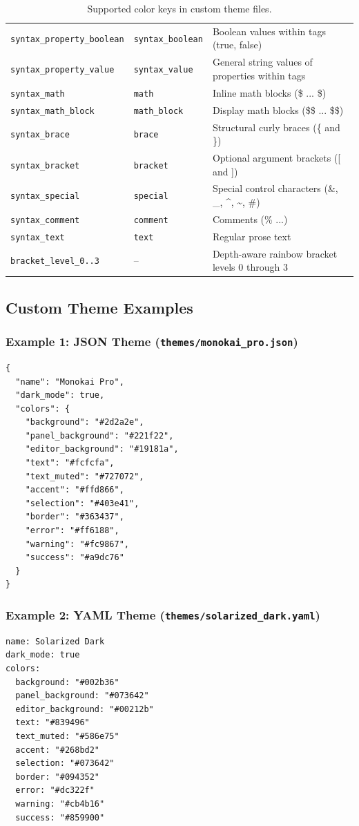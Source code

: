 \documentclass[11pt, a4paper]{article}
\begin{document}
\begin{table}[htbp]
\begin{tabular}{lll}
\texttt{syntax\_property\_boolean} & \texttt{syntax\_boolean} & Boolean values within tags (true, false) \\
\texttt{syntax\_property\_value} & \texttt{syntax\_value} & General string values of properties within tags \\
\texttt{syntax\_math} & \texttt{math} & Inline math blocks (\$ ... \$) \\
\texttt{syntax\_math\_block} & \texttt{math\_block} & Display math blocks (\$\$ ... \$\$) \\
\texttt{syntax\_brace} & \texttt{brace} & Structural curly braces (\{ and \}) \\
\texttt{syntax\_bracket} & \texttt{bracket} & Optional argument brackets ([ and ]) \\
\texttt{syntax\_special} & \texttt{special} & Special control characters (\&, \_, \^{}, \textasciitilde, \#) \\
\texttt{syntax\_comment} & \texttt{comment} & Comments (\% ...) \\
\texttt{syntax\_text} & \texttt{text} & Regular prose text \\
\texttt{bracket\_level\_0..3} & -- & Depth-aware rainbow bracket levels 0 through 3 \\
\bottomrule
\end{tabular}
\caption{Supported color keys in custom theme files.}
\label{tab:color_keys}
\end{table}

\subsection{Custom Theme Examples}

\subsubsection{Example 1: JSON Theme (\texttt{themes/monokai\_pro.json})}
\begin{verbatim}
{
  "name": "Monokai Pro",
  "dark_mode": true,
  "colors": {
    "background": "#2d2a2e",
    "panel_background": "#221f22",
    "editor_background": "#19181a",
    "text": "#fcfcfa",
    "text_muted": "#727072",
    "accent": "#ffd866",
    "selection": "#403e41",
    "border": "#363437",
    "error": "#ff6188",
    "warning": "#fc9867",
    "success": "#a9dc76"
  }
}
\end{verbatim}

\subsubsection{Example 2: YAML Theme (\texttt{themes/solarized\_dark.yaml})}
\begin{verbatim}
name: Solarized Dark
dark_mode: true
colors:
  background: "#002b36"
  panel_background: "#073642"
  editor_background: "#00212b"
  text: "#839496"
  text_muted: "#586e75"
  accent: "#268bd2"
  selection: "#073642"
  border: "#094352"
  error: "#dc322f"
  warning: "#cb4b16"
  success: "#859900"
\end{verbatim}
\end{document}
